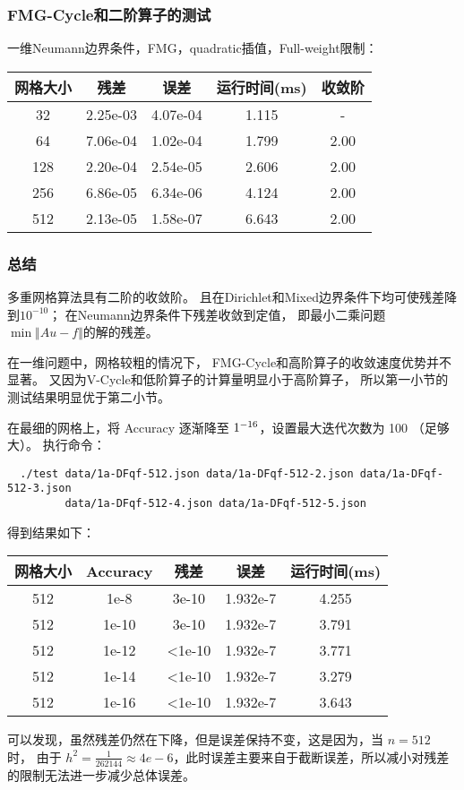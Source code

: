\documentclass[lang=cn,a4paper,newtx,bibend=bibtex]{elegantpaper}
\begin{document}
\subsubsection{FMG-Cycle和二阶算子的测试}

一维Neumann边界条件，FMG，quadratic插值，Full-weight限制：

\begin{longtable}{|c|cccc|} \hline
网格大小 & 残差 & 误差 & 运行时间(ms) & 收敛阶 \\ \hline
32 	& 2.25e-03	& 4.07e-04	& 1.115  & - \\ \hline
64 	& 7.06e-04	& 1.02e-04	& 1.799  & 2.00 \\ \hline
128	& 2.20e-04	& 2.54e-05	& 2.606  & 2.00 \\ \hline
256	& 6.86e-05	& 6.34e-06	& 4.124  & 2.00 \\ \hline
512	& 2.13e-05	& 1.58e-07	& 6.643  & 2.00 \\ \hline
\end{longtable}

\subsubsection{总结}

多重网格算法具有二阶的收敛阶。
且在Dirichlet和Mixed边界条件下均可使残差降到$10^{-10}$；
在Neumann边界条件下残差收敛到定值，
即最小二乘问题$\min\Vert Au-f\Vert$的解的残差。

在一维问题中，网格较粗的情况下，
FMG-Cycle和高阶算子的收敛速度优势并不显著。
又因为V-Cycle和低阶算子的计算量明显小于高阶算子，
所以第一小节的测试结果明显优于第二小节。

在最细的网格上，将 Accuracy 逐渐降至 $1 \time 10^{-16}$，设置最大迭代次数为 100 （足够大）。
执行命令：
\begin{lstlisting}
  ./test data/1a-DFqf-512.json data/1a-DFqf-512-2.json data/1a-DFqf-512-3.json 
         data/1a-DFqf-512-4.json data/1a-DFqf-512-5.json
\end{lstlisting}
得到结果如下：
\begin{longtable}{|c|cccc|} \hline
  网格大小 & Accuracy & 残差 & 误差 & 运行时间(ms)   \\ \hline
  512 	 & 1e-8 & 3e-10	& 1.932e-7	& 4.255   \\ \hline
  512 	 & 1e-10 & 3e-10	& 1.932e-7	& 3.791   \\ \hline
  512	& 1e-12 & <1e-10	& 1.932e-7	& 3.771   \\ \hline
  512	& 1e-14 & <1e-10	& 1.932e-7	& 3.279   \\ \hline
  512	& 1e-16 & <1e-10	& 1.932e-7	& 3.643   \\ \hline
  \end{longtable}
可以发现，虽然残差仍然在下降，但是误差保持不变，这是因为，当 $n = 512$ 时，
由于 $h^2 = \frac{1}{262144} \approx 4e-6$，此时误差主要来自于截断误差，所以减小对残差的限制无法进一步减少总体误差。
\end{document}
